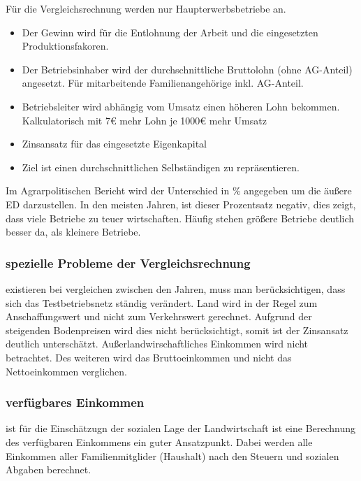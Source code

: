 \documentclass[11pt]{scrbook}
\begin{document}
Für die Vergleichsrechnung werden nur Haupterwerbsbetriebe an.
\begin{itemize}
	\item Der Gewinn wird für die Entlohnung der Arbeit und die eingesetzten Produktionsfakoren.

	\item Der Betriebsinhaber wird der durchschnittliche Bruttolohn (ohne \ac{AG}-Anteil) angesetzt. Für mitarbeitende Familienangehörige inkl. \ac{AG}-Anteil.

	\item Betriebsleiter wird abhängig vom Umsatz einen höheren Lohn bekommen. Kalkulatorisch mit 7€ mehr Lohn je 1000€ mehr Umsatz

	\item Zinsansatz für das eingesetzte Eigenkapital

	\item Ziel ist einen \glqq durchschnittlichen Selbständigen\grqq{} zu repräsentieren.
\end{itemize}

Im Agrarpolitischen Bericht wird der Unterschied in \% angegeben um die äußere \ac{ED} darzustellen.
In den meisten Jahren, ist dieser Prozentsatz negativ, dies zeigt, dass viele Betriebe zu teuer wirtschaften.
Häufig stehen größere Betriebe deutlich besser da, als kleinere Betriebe.

\subsubsection{spezielle Probleme der Vergleichsrechnung} existieren bei vergleichen zwischen den Jahren, muss man berücksichtigen, dass sich das Testbetriebsnetz ständig verändert.
Land wird in der Regel zum Anschaffungswert und nicht zum Verkehrswert gerechnet.
Aufgrund der steigenden Bodenpreisen wird dies nicht berücksichtigt, somit ist der Zinsansatz deutlich unterschätzt.
Außerlandwirschaftliches Einkommen wird nicht betrachtet.
Des weiteren wird das Bruttoeinkommen und nicht das Nettoeinkommen verglichen.

\subsubsection{verfügbares Einkommen} ist für die Einschätzugn der sozialen Lage der Landwirtschaft ist eine Berechnung des verfügbaren Einkommens ein guter Ansatzpunkt.
Dabei werden alle Einkommen aller Familienmitglider (Haushalt) nach den Steuern und sozialen Abgaben berechnet.
\end{document}
